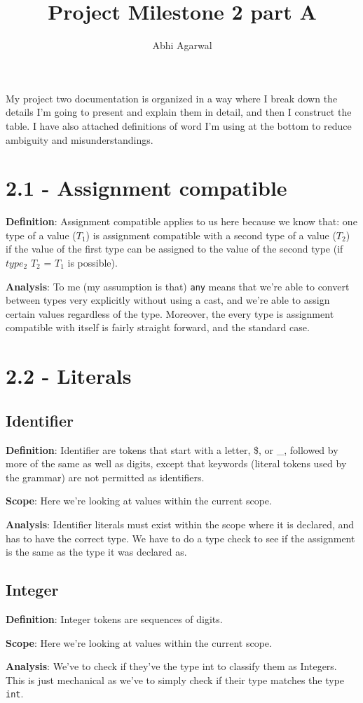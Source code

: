 \documentclass[11pt, oneside]{article}
\title{Project Milestone 2 part A}
\author{Abhi Agarwal}
\date{}
\begin{document}
\maketitle

\par My project two documentation is organized in a way where I break down the details I'm going to present and explain them in detail, and then I construct the table. I have also attached definitions of word I'm using at the bottom to reduce ambiguity and misunderstandings.

\section*{2.1 - Assignment compatible}
\par \textbf{Definition}: Assignment compatible applies to us here because we know that: one type of a value ($T_1$) is assignment compatible with a second type of a value ($T_2$) if the value of the first type can be assigned to the value of the second type (if $type_2$ $T_2$ = $T_1$ is possible). 
\par \textbf{Analysis}: To me (my assumption is that) \texttt{any} means that we're able to convert between types very explicitly without using a cast, and we're able to assign certain values regardless of the type. Moreover, the every type is assignment compatible with itself is fairly straight forward, and the standard case. 

\section*{2.2 - Literals}
\subsection*{Identifier}
\par \textbf{Definition}: Identifier are tokens that start with a letter, \$, or \_, followed by more of the same as well as digits, except that keywords (literal tokens used by the grammar) are not permitted as identifiers. 
\par \textbf{Scope}: Here we're looking at values within the current scope.
\par \textbf{Analysis}: Identifier literals must exist within the scope where it is declared, and has to have the correct type. We have to do a type check to see if the assignment is the same as the type it was declared as.

\subsection*{Integer}
\par \textbf{Definition}: Integer tokens are sequences of digits.
\par \textbf{Scope}: Here we're looking at values within the current scope.
\par \textbf{Analysis}: We've to check if they've the type int to classify them as Integers. This is just mechanical as we've to simply check if their type matches the type \texttt{int}.
\end{document}
